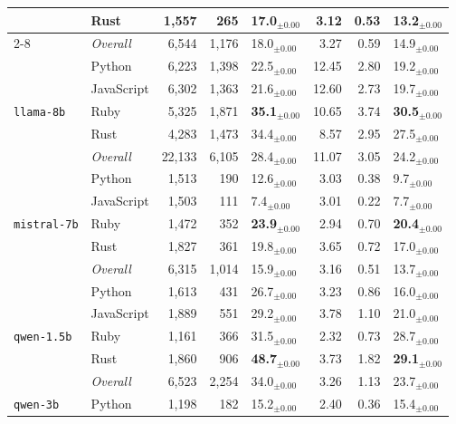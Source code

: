 \begin{longtable}{@{}llrrp{0.72cm}rrp{0.72cm}@{}}
       & Rust & 1,557 & 265 & 17.0$_{\pm 0.00}$ & 3.12 & 0.53 & 13.2$_{\pm 0.00}$ \\ \cmidrule(lr){2-8}
      & \textit{Overall} & 6,544 & 1,176 & 18.0$_{\pm 0.00}$ & 3.27 & 0.59 & 14.9$_{\pm 0.00}$ \\
    \midrule
      \multirow{5}{*}{\texttt{llama-8b}} & Python & 6,223 & 1,398 & 22.5$_{\pm 0.00}$ & 12.45 & 2.80 & 19.2$_{\pm 0.00}$ \\
       & JavaScript & 6,302 & 1,363 & 21.6$_{\pm 0.00}$ & 12.60 & 2.73 & 19.7$_{\pm 0.00}$ \\
       & Ruby & 5,325 & 1,871 & \textbf{35.1$_{\pm 0.00}$} & 10.65 & 3.74 & \textbf{30.5$_{\pm 0.00}$} \\
       & Rust & 4,283 & 1,473 & 34.4$_{\pm 0.00}$ & 8.57 & 2.95 & 27.5$_{\pm 0.00}$ \\ \cmidrule(lr){2-8}
      & \textit{Overall} & 22,133 & 6,105 & 28.4$_{\pm 0.00}$ & 11.07 & 3.05 & 24.2$_{\pm 0.00}$ \\
    \midrule
      \multirow{5}{*}{\texttt{mistral-7b}} & Python & 1,513 & 190 & 12.6$_{\pm 0.00}$ & 3.03 & 0.38 & 9.7$_{\pm 0.00}$ \\
       & JavaScript & 1,503 & 111 & 7.4$_{\pm 0.00}$ & 3.01 & 0.22 & 7.7$_{\pm 0.00}$ \\
       & Ruby & 1,472 & 352 & \textbf{23.9$_{\pm 0.00}$} & 2.94 & 0.70 & \textbf{20.4$_{\pm 0.00}$} \\
       & Rust & 1,827 & 361 & 19.8$_{\pm 0.00}$ & 3.65 & 0.72 & 17.0$_{\pm 0.00}$ \\ \cmidrule(lr){2-8}
      & \textit{Overall} & 6,315 & 1,014 & 15.9$_{\pm 0.00}$ & 3.16 & 0.51 & 13.7$_{\pm 0.00}$ \\
    \midrule
      \multirow{5}{*}{\texttt{qwen-1.5b}} & Python & 1,613 & 431 & 26.7$_{\pm 0.00}$ & 3.23 & 0.86 & 16.0$_{\pm 0.00}$ \\
       & JavaScript & 1,889 & 551 & 29.2$_{\pm 0.00}$ & 3.78 & 1.10 & 21.0$_{\pm 0.00}$ \\
       & Ruby & 1,161 & 366 & 31.5$_{\pm 0.00}$ & 2.32 & 0.73 & 28.7$_{\pm 0.00}$ \\
       & Rust & 1,860 & 906 & \textbf{48.7$_{\pm 0.00}$} & 3.73 & 1.82 & \textbf{29.1$_{\pm 0.00}$} \\ \cmidrule(lr){2-8}
      & \textit{Overall} & 6,523 & 2,254 & 34.0$_{\pm 0.00}$ & 3.26 & 1.13 & 23.7$_{\pm 0.00}$ \\
    \midrule
      \multirow{5}{*}{\texttt{qwen-3b}} & Python & 1,198 & 182 & 15.2$_{\pm 0.00}$ & 2.40 & 0.36 & 15.4$_{\pm 0.00}$ \\

\end{longtable}
